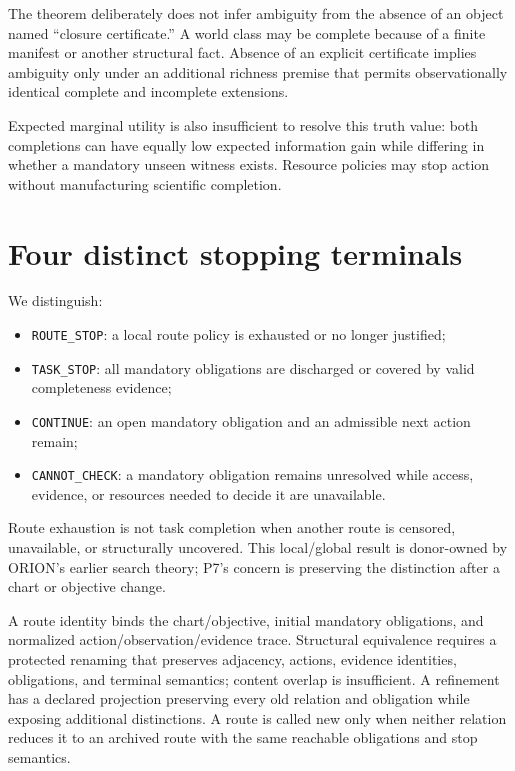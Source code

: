 \documentclass[11pt]{article}
\begin{document}
The theorem deliberately does not infer ambiguity from the absence of an object named ``closure certificate.'' A world class may be complete because of a finite manifest or another structural fact. Absence of an explicit certificate implies ambiguity only under an additional richness premise that permits observationally identical complete and incomplete extensions.

Expected marginal utility is also insufficient to resolve this truth value: both completions can have equally low expected information gain while differing in whether a mandatory unseen witness exists. Resource policies may stop action without manufacturing scientific completion.

\section{Four distinct stopping terminals}
We distinguish:
\begin{itemize}
\item \texttt{ROUTE\_STOP}: a local route policy is exhausted or no longer justified;
\item \texttt{TASK\_STOP}: all mandatory obligations are discharged or covered by valid completeness evidence;
\item \texttt{CONTINUE}: an open mandatory obligation and an admissible next action remain;
\item \texttt{CANNOT\_CHECK}: a mandatory obligation remains unresolved while access, evidence, or resources needed to decide it are unavailable.
\end{itemize}

Route exhaustion is not task completion when another route is censored, unavailable, or structurally uncovered. This local/global result is donor-owned by ORION's earlier search theory; P7's concern is preserving the distinction after a chart or objective change.

A route identity binds the chart/objective, initial mandatory obligations, and
normalized action/observation/evidence trace. Structural equivalence requires a
protected renaming that preserves adjacency, actions, evidence identities,
obligations, and terminal semantics; content overlap is insufficient. A
refinement has a declared projection preserving every old relation and
obligation while exposing additional distinctions. A route is called new only
when neither relation reduces it to an archived route with the same reachable
obligations and stop semantics.
\end{document}
